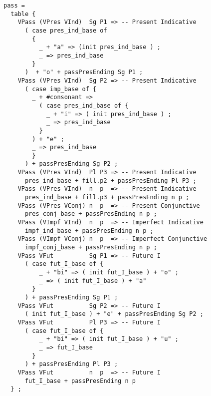 \begin{lstlisting}[float=h!tp,caption={Ausschnitt aus der Funktion \texttt{mkVerb} um passive Verbformen zu bilden (vgl. \textbf{ResLat.gf})},label={GF-Res-MkVerb-Act},basicstyle=\small]
pass = 
  table {
    VPass (VPres VInd)  Sg P1 => -- Present Indicative
      ( case pres_ind_base of
        {
          _ + "a" => (init pres_ind_base ) ;
          _ => pres_ind_base
        }
      )  + "o" + passPresEnding Sg P1 ;
    VPass (VPres VInd)  Sg P2 => -- Present Indicative
      ( case imp_base of {
        _ + #consonant => 
          ( case pres_ind_base of {
            _ + "i" => ( init pres_ind_base ) ;
            _ => pres_ind_base 
          }
        ) + "e" ;
        _ => pres_ind_base 
        }
      ) + passPresEnding Sg P2 ;
    VPass (VPres VInd)  Pl P3 => -- Present Indicative
      pres_ind_base + fill.p2 + passPresEnding Pl P3 ;
    VPass (VPres VInd)  n  p  => -- Present Indicative
      pres_ind_base + fill.p3 + passPresEnding n p ;
    VPass (VPres VConj) n  p  => -- Present Conjunctive
      pres_conj_base + passPresEnding n p ;
    VPass (VImpf VInd)  n  p  => -- Imperfect Indicative
      impf_ind_base + passPresEnding n p ;
    VPass (VImpf VConj) n  p  => -- Imperfect Conjunctive
      impf_conj_base + passPresEnding n p ;
    VPass VFut          Sg P1 => -- Future I
      ( case fut_I_base of {
          _ + "bi" => ( init fut_I_base ) + "o" ;
          _ => ( init fut_I_base ) + "a"
        }
      ) + passPresEnding Sg P1 ;
    VPass VFut          Sg P2 => -- Future I
      ( init fut_I_base ) + "e" + passPresEnding Sg P2 ;
    VPass VFut          Pl P3 => -- Future I
      ( case fut_I_base of {
          _ + "bi" => ( init fut_I_base ) + "u" ;
          _ => fut_I_base
        }
      ) + passPresEnding Pl P3 ;
    VPass VFut          n  p  => -- Future I
      fut_I_base + passPresEnding n p
  } ;
\end{lstlisting}
